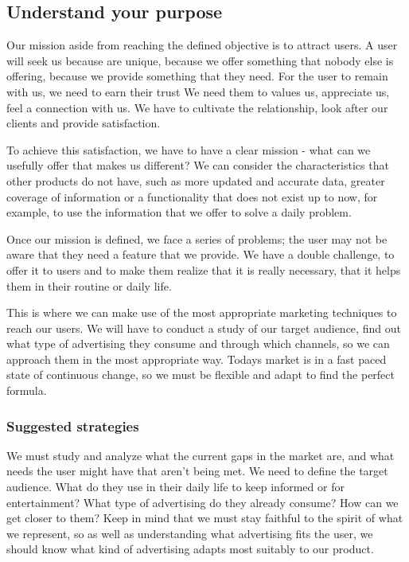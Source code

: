 \subsection{Understand your purpose}

Our mission aside from reaching the defined objective is to attract users.
A user will seek us because are unique, because we offer something that
nobody else is offering, because we provide something that they need.
For the user to remain with us, we need to earn their trust We need them to values us, appreciate us, feel a connection with us.
We have to cultivate the relationship, look after our clients and provide satisfaction.

To achieve this satisfaction, we have to have a clear mission - what can we usefully offer that makes us different?
We can consider the characteristics that other products do not have, such as more updated and accurate data,
greater coverage of information or a functionality that does not exist up to now, for example, to use the
information that we offer to solve a daily problem.

Once our mission is defined, we face a series of problems; the user may not be aware that they need a feature that we provide. We have a double challenge, to offer it to users and
to make them realize that it is really necessary, that it helps them in their routine or daily life.

This is where we can make use of the most appropriate marketing techniques to reach our users.
We will have to conduct a study of our target audience, find out what type of advertising they consume and through which channels, so we can approach them in the most appropriate way. Todays market is in a fast paced state of continuous change,
so we must be flexible and adapt to find the perfect formula.

\subsubsection*{Suggested strategies}

We must study and analyze what the current gaps in the market are, and what needs the user might have that aren't being met.
We need to define the target audience. What do they use in their daily life to keep informed or for entertainment? What type of advertising do they already consume? How can we get closer to them? Keep in mind that we must stay
faithful to the spirit of what we represent, so as well as understanding what advertising fits the user, we should know what kind of advertising
adapts most suitably to our product.

